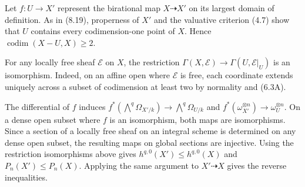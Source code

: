 Let $f:U\to X'$ represent the birational map $X\dashrightarrow X'$ on its largest domain of definition. As in (8.19), properness of $X'$ and the valuative criterion (4.7) show that $U$ contains every codimension-one point of $X$. Hence $\operatorname{codim}(X-U,X)\ge2$.

For any locally free sheaf $\mathcal E$ on $X$, the restriction $\Gamma(X,\mathcal E)\to\Gamma(U,\mathcal E|_U)$ is an isomorphism. Indeed, on an affine open where $\mathcal E$ is free, each coordinate extends uniquely across a subset of codimension at least two by normality and (6.3A).

The differential of $f$ induces $f^*(\bigwedge^q\Omega_{X'/k})\to\bigwedge^q\Omega_{U/k}$ and $f^*(\omega_{X'}^{\otimes n})\to\omega_U^{\otimes n}$. On a dense open subset where $f$ is an isomorphism, both maps are isomorphisms. Since a section of a locally free sheaf on an integral scheme is determined on any dense open subset, the resulting maps on global sections are injective. Using the restriction isomorphisms above gives $h^{q,0}(X')\le h^{q,0}(X)$ and $P_n(X')\le P_n(X)$. Applying the same argument to $X'\dashrightarrow X$ gives the reverse inequalities.
